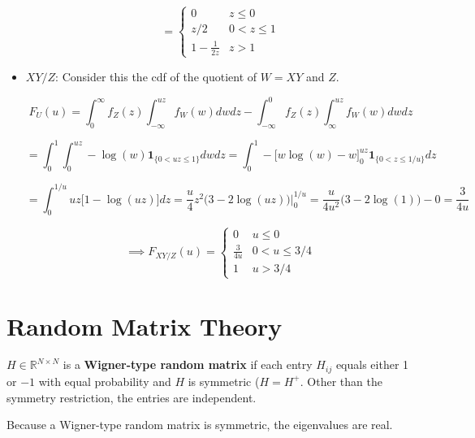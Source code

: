\begin{solution}
\begin{itemize}
\[
=  \boxed{ \begin{cases} 
     0   & z \leq 0 \\
     z/2   & 0 < z \leq 1 \\
     1 - \frac{1}{2z} & z > 1
     \end{cases}}
\]

\item \(XY/Z\): Consider this the cdf of the quotient of \(W = XY\) and \(Z\).

\[
F_U(u)=\int_0^\infty f_Z(z) \int_{-\infty}^{uz} f_W(w) dw dz - \int_{-\infty}^0 f_Z(z) \int_{\infty}^ {uz} f_W(w) dw dz
\]

\[
=\int_0^1  \int_{0}^{uz} - \log(w)  \boldsymbol{1}_{\{0 < uz \leq 1\}} dw dz  =\int_0^1   - \big[ w \log(w) - w \big]_0^{uz} \boldsymbol{1}_{\{0 < z \leq 1/u\}}  dz  
\]

\[
=\int_0^{1/u} uz  \big[1  - \log(uz)  \big] dz = \frac{u}{4}z^2\big( 3 - 2 \log(uz) \big) \bigg|_0^{1/u}  = \frac{u}{4u^2}\big( 3 - 2 \log(1) \big) - 0 = \frac{3}{4u}
\]

\[
\implies \boxed{ F_{XY/Z}(u) =  \begin{cases} 
     0   & u \leq 0 \\
     \frac{3}{4u} & 0 < u \leq 3/4 \\
     1 & u > 3/4
     \end{cases}}
\]

\end{itemize}

\end{solution}

\section{Random Matrix Theory}

\begin{definition}

\(H \in \mathbb{R}^{N \times N}\) is a \textbf{Wigner-type random matrix} if each entry \(H_{ij}\) equals either 1 or \(-1\) with equal probability and \(H\) is symmetric (\(H = H^+\). Other than the symmetry restriction, the entries are independent.

\end{definition}

\begin{remark}
Because a Wigner-type random matrix is symmetric, the eigenvalues are real.
\end{remark}

